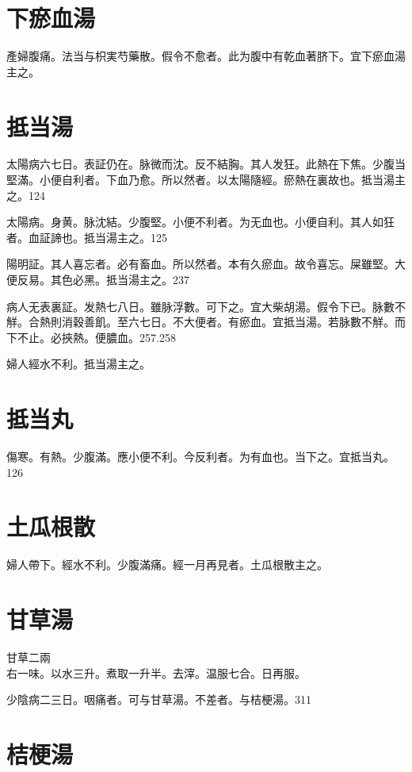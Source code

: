 \documentclass[12pt,twoside,UTF8,b5paper]{ctexbook}
\begin{document}
\section{下瘀血湯}

產婦腹痛。法当与枳実芍藥散。假令不愈者。此为腹中有乾血著脐下。宜下瘀血湯主之。

\section{抵当湯}

太陽病六七日。表証仍在。脉微而沈。反不結胸。其人发狂。此熱在下焦。少腹当堅滿。小便自利者。下血乃愈。所以然者。以太陽隨經。瘀熱在裏故也。抵当湯主之。124

太陽病。身黄。脉沈結。少腹堅。小便不利者。为无血也。小便自利。其人如狂者。血証諦也。抵当湯主之。125

陽明証。其人喜忘者。必有畜血。所以然者。本有久瘀血。故令喜忘。屎雖堅。大便反易。其色必黑。抵当湯主之。237

病人无表裏証。发熱七八日。雖脉浮數。可下之。{宜大柴胡湯。}假令下已。脉數不觧。合熱則消穀善飢。至六七日。不大便者。有瘀血。宜抵当湯。若脉數不觧。而下不止。必挾熱。便膿血。257.258

婦人經水不利。抵当湯主之。

\section{抵当丸}

傷寒。有熱。少腹滿。應小便不利。今反利者。为有血也。当下之。宜抵当丸。126

\section{土瓜根散}

{婦人}帶下。經水不利。少腹滿痛。經一月再見者。土瓜根散主之。

\section{甘草湯}

甘草{\scriptsize 二兩}\\
右一味。以水三升。煮取一升半。去滓。温服七合。日再服。

少陰病二三日。咽痛者。可与甘草湯。不差者。与桔梗湯。311

\section{桔梗湯}
\end{document}
